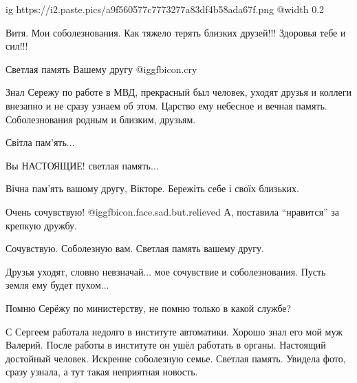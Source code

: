  
 
 
 
 
\zzSecCmt

\begin{itemize} %

\ifcmt
  ig https://i2.paste.pics/a9f560577c7773277a83df4b58ada67f.png
  @width 0.2
\fi

Витя. Мои соболезнования. Как тяжело терять близких друзей!!! Здоровья тебе и сил!!!


Светлая память Вашему другу @igg{fbicon.cry} 


Знал Сережу по работе в МВД, прекрасный был человек, уходят друзья и коллеги
внезапно и не сразу узнаем об этом. Царство ему небесное и вечная
память. Соболезнования родным и близким, друзьям.


Світла пам'ять...

Вы НАСТОЯЩИЕ! светлая память...

Вічна пам'ять вашому другу, Вікторе.
Бережіть себе і своїх близьких.

Очень сочувствую! @igg{fbicon.face.sad.but.relieved}  А, поставила \enquote{нравится} за крепкую дружбу.

Сочувствую. Соболезную вам. Светлая память вашему другу.

Друзья уходят, словно невзначай... мое сочувствие и соболезнования. Пусть земля ему будет пухом...

Помню Серёжу по министерству, не помню только в какой службе?


С Сергеем работала недолго в институте автоматики. Хорошо знал его мой муж
Валерий. После работы в институте он ушёл работать в органы. Настоящий
достойный человек. Искренне соболезную семье. Светлая память. Увидела фото,
сразу узнала, а тут такая неприятная новость.



\end{itemize}
